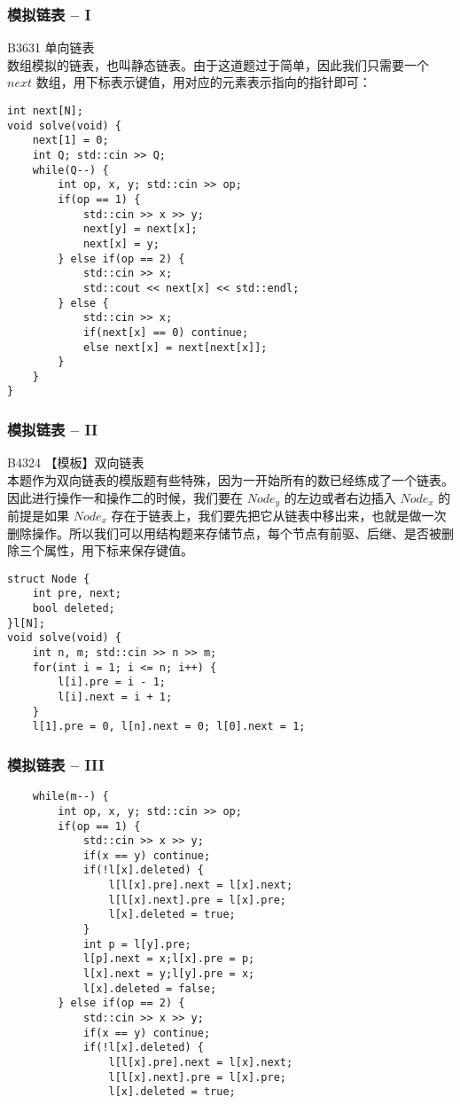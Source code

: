 \documentclass{beamer}
\begin{document}
\begin{frame}[fragile]
\frametitle{模拟链表 -- I}
B3631 单向链表\\
数组模拟的链表，也叫静态链表。由于这道题过于简单，因此我们只需要一个 $next$ 数组，用下标表示键值，用对应的元素表示指向的指针即可：\\
\begin{onlyenv}
\begin{verbatim}
int next[N];
void solve(void) {
    next[1] = 0;
    int Q; std::cin >> Q;
    while(Q--) {
        int op, x, y; std::cin >> op;
        if(op == 1) {
            std::cin >> x >> y;
            next[y] = next[x];
            next[x] = y;
        } else if(op == 2) {
            std::cin >> x;
            std::cout << next[x] << std::endl;
        } else {
            std::cin >> x;
            if(next[x] == 0) continue;
            else next[x] = next[next[x]];
        }
    }
}
\end{verbatim}
\end{onlyenv}
\end{frame}
\begin{frame}[fragile]
\frametitle{模拟链表 -- II}
B4324 【模板】双向链表 \\ 
本题作为双向链表的模版题有些特殊，因为一开始所有的数已经练成了一个链表。因此进行操作一和操作二的时候，我们要在 $Node_y$ 的左边或者右边插入 $Node_x$ 的前提是如果 $Node_x$ 存在于链表上，我们要先把它从链表中移出来，也就是做一次删除操作。所以我们可以用结构题来存储节点，每个节点有前驱、后继、是否被删除三个属性，用下标来保存键值。
\begin{onlyenv}
\begin{verbatim}
struct Node {
    int pre, next;
    bool deleted;
}l[N];
void solve(void) {
    int n, m; std::cin >> n >> m;
    for(int i = 1; i <= n; i++) {
        l[i].pre = i - 1;
        l[i].next = i + 1;
    }
    l[1].pre = 0, l[n].next = 0; l[0].next = 1;
\end{verbatim}
\end{onlyenv}
\end{frame}
\begin{frame}[fragile]
\frametitle{模拟链表 -- III}
\begin{onlyenv}
\begin{verbatim}
    while(m--) {
        int op, x, y; std::cin >> op;
        if(op == 1) {
            std::cin >> x >> y;
            if(x == y) continue;
            if(!l[x].deleted) {
                l[l[x].pre].next = l[x].next;
                l[l[x].next].pre = l[x].pre;
                l[x].deleted = true;
            }
            int p = l[y].pre;
            l[p].next = x;l[x].pre = p;
            l[x].next = y;l[y].pre = x;
            l[x].deleted = false;
        } else if(op == 2) {
            std::cin >> x >> y;
            if(x == y) continue;
            if(!l[x].deleted) {
                l[l[x].pre].next = l[x].next;
                l[l[x].next].pre = l[x].pre;
                l[x].deleted = true;
\end{verbatim}
\end{onlyenv}
\end{frame}
\end{document}
